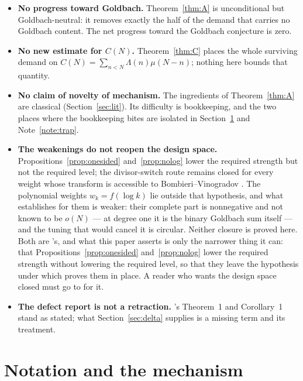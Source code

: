 \documentclass[11pt,a4paper]{article}
\theoremstyle{plain}
\theoremstyle{definition}
\theoremstyle{remark}
\begin{document}
\begin{itemize}
\item \textbf{No progress toward Goldbach.} Theorem~\ref{thm:A} is
unconditional but Goldbach-neutral: it removes exactly the half of the
demand that carries no Goldbach content. The net progress toward the
Goldbach conjecture is zero.

\item \textbf{No new estimate for $C(N)$.} Theorem~\ref{thm:C} places
the whole surviving demand on
$C(N)=\sum_{n<N}\Lambda(n)\mu(N-n)$; nothing here bounds that quantity.

\item \textbf{No claim of novelty of mechanism.} The ingredients of
Theorem~\ref{thm:A} are classical (Section~\ref{sec:lit}). Its
difficulty is bookkeeping, and the two places where the bookkeeping
bites are isolated in Section~\ref{sec:mechanism} and
Note~\ref{note:trap}.

\item \textbf{The weakenings do not reopen the design space.}
Propositions~\ref{prop:onesided} and~\ref{prop:nolog} lower the
required strength but not the required level; the divisor-switch route
remains closed for every weight whose transform is accessible to
Bombieri--Vinogradov \cite{P2}. The polynomial weights
$w_k=f(\log k)$ lie outside that hypothesis, and what \cite{P2}
establishes for them is weaker: their complete part is nonnegative and
not known to be $o(N)$ --- at degree one it is the binary Goldbach sum
itself --- and the tuning that would cancel it is circular. Neither
closure is proved here. Both are \cite{P2}'s, and what this paper
asserts is only the narrower thing it can: that
Propositions~\ref{prop:onesided} and~\ref{prop:nolog} lower the
required strength without lowering the required level, so that they
leave the hypothesis under which \cite{P2} proves them in place. A
reader who wants the design space closed must go to \cite{P2} for it.

\item \textbf{The defect report is not a retraction.} \cite{HL}'s
Theorem~1 and Corollary~1 stand as stated; what
Section~\ref{sec:delta} supplies is a missing term and its treatment.
\end{itemize}

\section{Notation and the mechanism}\label{sec:mechanism}
\end{document}
